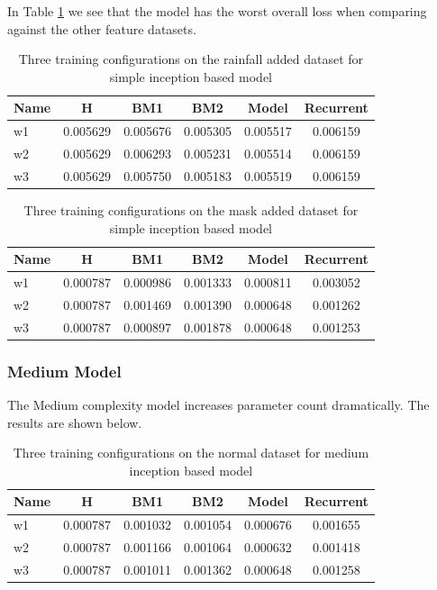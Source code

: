 In Table \ref{tab:simple_rf} we see that the model has the worst overall loss when comparing against the other feature datasets.
\begin{table}[htbp]
	\centering
	\caption{Three training configurations on the rainfall added dataset for simple inception based model}
	\label{tab:simple_rf}
	\begin{tabular}{p{2cm}ccccc}
		\toprule
		Name &  H &  BM1 &  BM2 &  Model &  Recurrent \\
		\midrule
		w1 &       0.005629 &        0.005676 &        0.005305 &   0.005517 &            0.006159 \\
		w2 &       0.005629 &        0.006293 &        0.005231 &   0.005514 &            0.006159 \\
		w3 &       0.005629 &        0.005750 &        0.005183 &   0.005519 &            0.006159 \\
		\bottomrule
	\end{tabular}
\end{table}

\begin{table}[htbp]
	\centering
	\caption{Three training configurations on the mask added dataset for simple inception based model}
	\label{tab:simple_mask}
	\begin{tabular}{p{2cm}ccccc}
		\toprule
		Name &  H &  BM1 &  BM2 &  Model &  Recurrent \\
		\midrule
		w1 &       0.000787 &        0.000986 &        0.001333 &   0.000811 &            0.003052 \\
		w2 &       0.000787 &        0.001469 &        0.001390 &   0.000648 &            0.001262 \\
		w3 &       0.000787 &        0.000897 &        0.001878 &   0.000648 &            0.001253 \\
		\bottomrule
	\end{tabular}
\end{table}


\subsubsection*{Medium Model}
The Medium complexity model increases parameter count dramatically. The results are shown below.
\begin{table}[htbp]
	\centering
	\caption{Three training configurations on the normal dataset for medium inception based model}
	\label{tab:medium_normal}
	\begin{tabular}{p{2cm}ccccc}
		\toprule
		Name &  H &  BM1 &  BM2 &  Model &  Recurrent \\
		\midrule
		w1 &       0.000787 &        0.001032 &        0.001054 &   0.000676 &            0.001655 \\
		w2 &       0.000787 &        0.001166 &        0.001064 &   0.000632 &            0.001418 \\
		w3 &       0.000787 &        0.001011 &        0.001362 &   0.000648 &            0.001258 \\
		\bottomrule
	\end{tabular}
\end{table}


